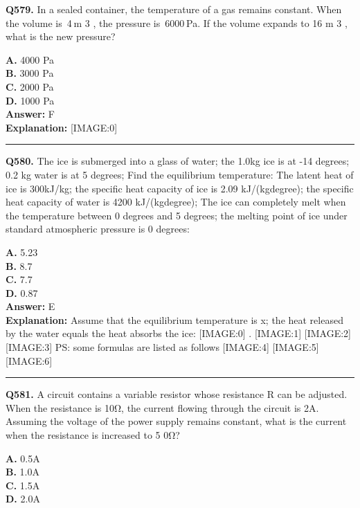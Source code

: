 \documentclass[12pt]{article}
\begin{document}
\noindent
\textbf{Q579.} In a sealed container, the temperature of a gas remains constant. When the volume is 4 m
3
, the pressure is 6000 Pa. If the volume expands to
16
m
3
, what is the new pressure?



\textbf{A.} 4000 Pa \\
\textbf{B.} 3000 Pa \\
\textbf{C.} 2000 Pa \\
\textbf{D.} 1000 Pa \\

\textbf{Answer:} F \\
\textbf{Explanation:} [IMAGE:0]

\hrule
\vspace{1em}


\noindent
\textbf{Q580.} The ice is submerged into a glass of water; the 1.0kg ice is at -14 degrees; 0.2 kg water is at 5 degrees; Find the equilibrium temperature: The latent heat of ice is 300kJ/kg; the specific heat capacity of ice is 2.09 kJ/(kg\cdot degree); the specific heat capacity of water is 4200 kJ/(kg\cdot degree); The ice can completely melt when the temperature between 0 degrees and 5 degrees; the melting point of ice under standard atmospheric pressure is 0 degrees:



\textbf{A.} 5.23 \\
\textbf{B.} 8.7 \\
\textbf{C.} 7.7 \\
\textbf{D.} 0.87 \\

\textbf{Answer:} E \\
\textbf{Explanation:} Assume that the equilibrium temperature is x; the heat released by the water equals the heat absorbs the ice:
[IMAGE:0]
.
[IMAGE:1]
[IMAGE:2]
[IMAGE:3]
PS: some formulas are listed as follows
[IMAGE:4]
[IMAGE:5]
[IMAGE:6]

\hrule
\vspace{1em}


\noindent
\textbf{Q581.} A circuit contains a variable resistor whose resistance R can be adjusted. When the resistance is 10Ω, the current flowing through the circuit is 2A. Assuming the voltage of the power supply remains constant, what is the current when the resistance is increased to
5
0Ω?



\textbf{A.} 0.5A \\
\textbf{B.} 1.0A \\
\textbf{C.} 1.5A \\
\textbf{D.} 2.0A \\
\end{document}
